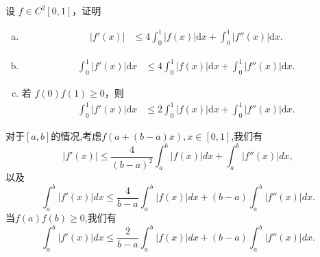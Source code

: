 \documentclass[../../main.tex]{subfiles}
\begin{document}
\begin{example}
设 \( f \in C^2[0,1] \)，证明
\begin{enumerate}[(a)]
\item 
\begin{align}
|f'(x)| &\leqslant 4\int_0^1 |f(x)| \mathrm{d}x + \int_0^1 |f''(x)| \mathrm{d}x. \label{eq::::::::::::::7151--------------5}
\end{align}

\item 
\begin{align}
\int_0^1 |f'(x)| \mathrm{d}x &\leqslant 4\int_0^1 |f(x)| \mathrm{d}x + \int_0^1 |f''(x)| \mathrm{d}x .\label{eq::::::::::::::7151--------------6}
\end{align}

\item  若 \( f(0)f(1) \geqslant 0 \)，则
\begin{align}
\int_0^1 |f'(x)| \mathrm{d}x &\leqslant 2\int_0^1 |f(x)| \mathrm{d}x + \int_0^1 |f''(x)| \mathrm{d}x. \label{eq::::::::::::::7151--------------7}
\end{align}
\end{enumerate}
\end{example}
\begin{note}
对于$[a,b]$的情况,考虑$f(a+(b-a)x),x\in[0,1]$,我们有
\[
|f'(x)|\leqslant \frac{4}{(b-a)^2}\int_a^b|f(x)|dx+\int_a^b|f''(x)|dx,
\]
以及
\[
\int_a^b|f'(x)|dx\leqslant \frac{4}{b-a}\int_a^b|f(x)|dx+(b-a)\int_a^b|f''(x)|dx.
\]
当$f(a)f(b)\geqslant 0$,我们有
\[
\int_a^b|f'(x)|dx\leqslant \frac{2}{b-a}\int_a^b|f(x)|dx+(b-a)\int_a^b|f''(x)|dx.
\]
\end{note}
\end{document}
